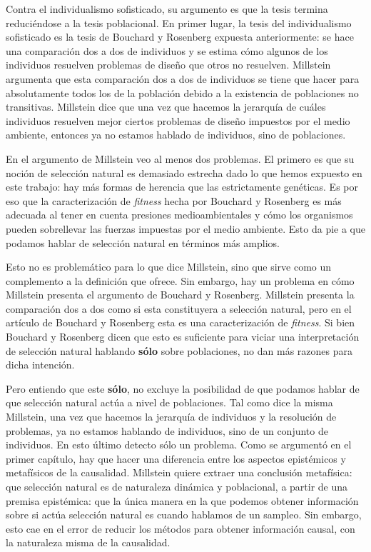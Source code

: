 Contra el individualismo sofisticado, su argumento es que la tesis termina reduciéndose a la tesis poblacional. En primer lugar, la tesis del individualismo sofisticado es la tesis de Bouchard y Rosenberg expuesta anteriormente: se hace una comparación dos a dos de individuos y se estima cómo algunos de los individuos resuelven problemas de diseño que otros no resuelven. Millstein argumenta que esta comparación dos a dos de individuos se tiene que hacer para absolutamente todos los de la población debido a la existencia de poblaciones no transitivas. Millstein dice que una vez que hacemos la jerarquía de cuáles individuos resuelven mejor ciertos problemas de diseño impuestos por el medio ambiente, entonces ya no estamos hablado de individuos, sino de poblaciones.

En el argumento de Millstein veo al menos dos problemas. El primero es que su noción de selección natural es demasiado estrecha dado lo que hemos expuesto en este trabajo: hay más formas de herencia que las estrictamente genéticas. Es por eso que la caracterización de \emph{fitness} hecha por Bouchard y Rosenberg es más adecuada al tener en cuenta presiones medioambientales y cómo los organismos pueden sobrellevar las fuerzas impuestas por el medio ambiente. Esto da pie a que podamos hablar de selección natural en términos más amplios.

Esto no es problemático para lo que dice Millstein, sino que sirve como un complemento a la definición que ofrece. Sin embargo, hay un problema en cómo Millstein presenta el argumento de Bouchard y Rosenberg. Millstein presenta la comparación dos a dos como si esta constituyera a selección natural, pero en el artículo de Bouchard y Rosenberg esta es una caracterización de \emph{fitness}. Si bien Bouchard y Rosenberg dicen que esto es suficiente para viciar una interpretación de selección natural hablando \textbf{sólo} sobre poblaciones, no dan más razones para dicha intención.

Pero entiendo que este \textbf{sólo}, no excluye la posibilidad de que podamos hablar de que selección natural actúa a nivel de poblaciones. Tal como dice la misma Millstein, una vez que hacemos la jerarquía de individuos y la resolución de problemas, ya no estamos hablando de individuos, sino de un conjunto de individuos. En esto último detecto sólo un problema. Como se argumentó en el primer capítulo, hay que hacer una diferencia entre los aspectos epistémicos y metafísicos de la causalidad. Millstein quiere extraer una conclusión metafísica: que selección natural es de naturaleza dinámica y poblacional, a partir de una premisa epistémica: que la única manera en la que podemos obtener información sobre si actúa selección natural es cuando hablamos de un sampleo. Sin embargo, esto cae en el error de reducir los métodos para obtener información causal, con la naturaleza misma de la causalidad.

